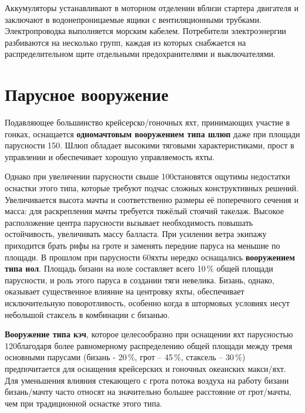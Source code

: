 Аккумуляторы устанавливают в моторном отделении вблизи стартера
двигателя и заключают в водонепроницаемые ящики с вентиляционными
трубками. Электропроводка выполняется морским кабелем. Потребители
электроэнергии разбиваются на несколько групп, каждая из которых
снабжается на распределительном щите отдельными предохранителями и
выключателями.

\section{Парусное вооружение}

Подавляющее большинство крейсерско\-/гоночных яхт, принимающих участие
в гонках, оснащается \textbf{одномачтовым вооружением типа
шлюп} даже при площади
парусности 150\msq. Шлюп обладает высокими тяговыми
характеристиками, прост в управлении и обеспечивает хорошую
управляемость яхты.

Однако при увеличении парусности свыше 100\msq становятся ощутимы
недостатки оснастки этого типа, которые требуют подчас сложных
конструктивных решений. Увеличивается высота мачты и соответственно
размеры её поперечного сечения и масса: для раскрепления мачты
требуется тяжёлый стоячий такелаж. Высокое расположение центра
парусности вызывает необходимость повышать остойчивость, увеличивать
массу балласта. При усилении ветра экипажу приходится брать рифы на
гроте и заменять передние паруса на меньшие по площади. В прошлом при
парусности 60\msq яхты нередко оснащались \textbf{вооружением типа
иол}. Площадь бизани на иоле
составляет всего 10\,\% общей площади парусности, и роль этого
паруса в создании тяги невелика. Бизань, однако, оказывает
существенное влияние на центровку яхты, обеспечивает исключительную
поворотливость, особенно когда в штормовых условиях несут небольшой
стаксель в комбинации с бизанью.

\textbf{Вооружение типа кэч}, которое
целесообразно при оснащении яхт парусностью 120\msq благодаря
более равномерному распределению общей площади между тремя основными
парусами (бизань \-- 20\,\%, грот \--- 45\,\%,
стаксель \--- 30\,\%) предпочитается для оснащения крейсерских
и гоночных океанских макси\-/яхт. Для уменьшения влияния стекающего с
грота потока воздуха на работу бизани бизань\-/мачту часто относят на
значительно большее расстояние от грот\-/мачты, чем при традиционной
оснастке этого типа.

